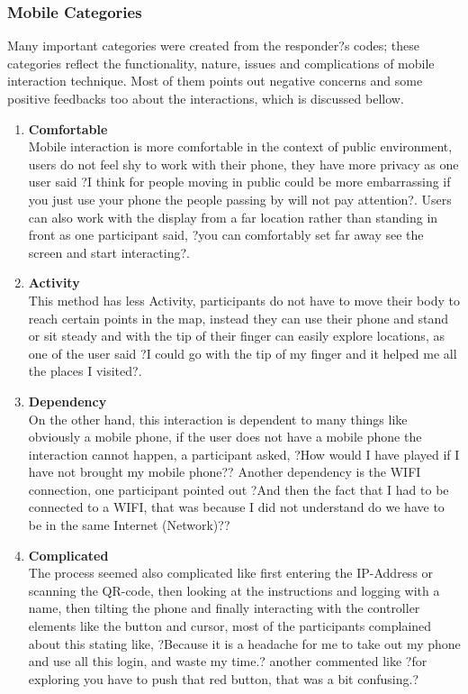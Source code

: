 \subsubsection{Mobile Categories}
Many important categories were created from the responder?s codes; these categories reflect the functionality, nature, issues and complications of mobile interaction technique. Most of them points out negative concerns and some positive feedbacks too about the interactions, which is discussed bellow.
\begin{enumerate}
\item	\textbf{Comfortable} \\
	Mobile interaction is more comfortable in the context of public environment, users do not feel shy to work with their phone, they have more privacy as one user said ?I think for people moving in public could be more embarrassing if you just use your phone the people passing by will not pay attention?. Users can also work with the display from a far location rather than standing in front as one participant said, ?you can comfortably set far away see the screen and start interacting?.
\item	\textbf{Activity} \\
	This method has less Activity, participants do not have to move their body to reach certain points in the map, instead they can use their phone and stand or sit steady and with the tip of their finger can easily explore locations, as one of the user said ?I could go with the tip of my finger and it helped me all the places I visited?.
\item	\textbf{Dependency}\\
	On the other hand, this interaction is dependent to many things like obviously a mobile phone, if the user does not have a mobile phone the interaction cannot happen, a participant asked, ?How would I have played if I have not brought my mobile phone?? Another dependency is the WIFI connection, one participant pointed out ?And then the fact that I had to be connected to a WIFI, that was because I did not understand do we have to be in the same Internet (Network)?? 

\item	\textbf{Complicated}\\
The process seemed also complicated like first entering the IP-Address or scanning the QR-code, then looking at the instructions and logging with a name, then tilting the phone and finally interacting with the controller elements like the button and cursor, most of the participants complained about this stating like, ?Because it is a headache for me to take out my phone and use all this login, and waste my time.? another commented like ?for exploring you have to push that red button, that was a bit confusing.? 



\end{enumerate}
